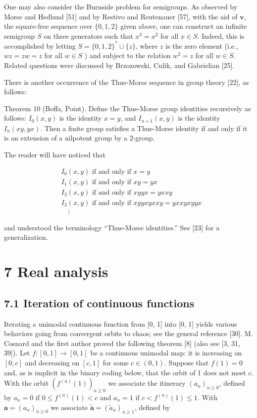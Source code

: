\documentclass[10pt]{article}
\begin{document}
One may also consider the Burnside problem for semigroups. As observed by Morse and Hedlund [51] and by Restivo and Reutenauer [57], with the aid of $\mathbf{v}$, the square-free sequence over $\{0,1,2\}$ given above, one can construct an infinite semigroup $S$ on three generators such that $x^{3}=x^{2}$ for all $x \in S$. Indeed, this is accomplished by letting $S=\{0,1,2\}^{*} \cup\{z\}$, where $z$ is the zero element (i.e., $w z=z w=z$ for all $w \in S$ ) and subject to the relation $w^{2}=z$ for all $w \in S$. Related questions were discussed by Brzozowski, Culik, and Gabrielian [25].

There is another occurrence of the Thue-Morse sequence in group theory [22], as follows:

Theorem 10 (Boffa, Point). Define the Thue-Morse group identities recursively as follows: $I_0(x,y)$ is the identity $x=y$, and $I_{n+1}(x,y)$ is the identity $I_n(xy,yx)$. Then a finite group satisfies a Thue-Morse identity if and only if it is an extension of a nilpotent group by a 2-group.

The reader will have noticed that

\[
\begin{aligned}
& I_{0}(x, y) \text { if and only if } x=y \\
& I_{1}(x, y) \text { if and only if } x y=y x \\
& I_{2}(x, y) \text { if and only if } x y y x=y x x y \\
& I_{3}(x, y) \text { if and only if } x y y x y x x y=y x x y x y y x \\
& \quad \vdots
\end{aligned}
\]

and understood the terminology ``Thue-Morse identities.'' See [23] for a generalization.

\section*{7 Real analysis}
\subsection*{7.1 Iteration of continuous functions}
Iterating a unimodal continuous function from [0, 1] into [0, 1] yields various behaviors going from convergent orbits to chaos; see the general reference [30]. M. Cosnard and the first author proved the following theorem [8] (also see [3, 31, 39]). Let $f:[0,1]\to[0,1]$ be a continuous unimodal map: it is increasing on $[0,c]$ and decreasing on $[c,1]$ for some $c\in(0,1)$. Suppose that $f(1)=0$ and, as is implicit in the binary coding below, that the orbit of 1 does not meet $c$. With the orbit $(f^{(n)}(1))_{n\geq 0}$ we associate the itinerary $(a_n)_{n\geq 0}$, defined by $a_n=0$ if $0\leq f^{(n)}(1)<c$ and $a_n=1$ if $c<f^{(n)}(1)\leq 1$. With $\mathbf{a}=(a_n)_{n\geq 0}$ we associate $\widetilde{\mathbf{a}}=(\widetilde a_n)_{n\geq 1}$, defined by
\end{document}

